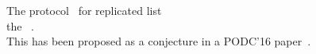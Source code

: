 
\begin{frame}{}
  \begin{center}
    {\Large The  protocol~\cite{} for replicated list \\
     the ~\cite{Attiya:PODC16}.}  \\[25pt]

    {\large This has been proposed as a conjecture in a PODC'16 paper~\cite{Attiya:PODC16}.}
  \end{center}
\end{frame}

